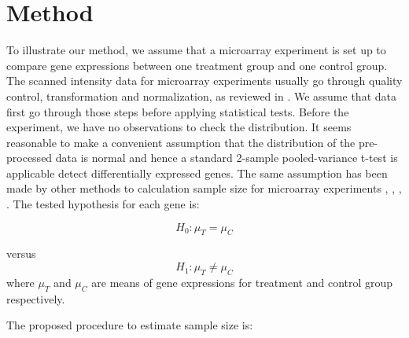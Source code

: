 \documentclass[12pt]{article}
\begin{document}
\section{Method}
To illustrate our method, we assume that a microarray experiment
is set up to compare gene expressions between one treatment group
and one control group.  The scanned intensity data for microarray
experiments usually go through quality control, transformation and
normalization, as reviewed in \citep{Smyth03, Quackenbush02}. We
assume that data first go through those steps before applying
statistical tests.  Before the experiment, we have no observations
to check the distribution.  It seems reasonable to make a
convenient assumption that the distribution of the pre-processed
data is normal and hence a standard 2-sample pooled-variance
t-test is applicable detect differentially expressed genes. The
same assumption has been made by other methods to calculation
sample size for microarray experiments \citep{Yang03},
\citep{Liu05}, \citep{Dobbin05}, \citep{Pawitan05}. The tested
hypothesis for each gene is:

\begin{equation}
  H_0: \mu_{T} = \mu_{C}  \nonumber
\end{equation}

versus
\begin{equation}
  H_1: \mu_{T} \neq \mu_{C} \nonumber
\end{equation}
where $\mu_{T}$ and $\mu_{C}$ are means of gene expressions for
treatment and control group respectively.

The proposed procedure to estimate sample size is:
\end{document}
